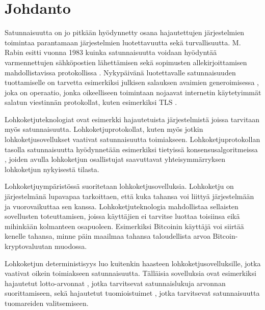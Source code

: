 \chapter{Johdanto\label{intro}}

Satunnaisuutta on jo pitkään hyödynnetty osana hajautettujen järjestelmien toimintaa parantamaan järjestelmien luotettavuutta sekä turvallisuutta. M. Rabin esitti vuonna 1983 kuinka satunnaisuutta voidaan hyödyntää varmennettujen sähköpostien lähettämisen sekä sopimusten allekirjoittamisen mahdollistavissa protokollissa \cite{rabin_transaction_1983}. Nykypäivänä luotettavalle satunnaisuuden tuottamiselle on tarvetta esimerkiksi julkisen salauksen avaimien generoimisessa \cite{corrigan-gibbs_ensuring_2014}, joka on operaatio, jonka oikeelliseen toimintaan nojaavat internetin käytetyimmät salatun viestinnän protokollat, kuten esimerkiksi TLS \cite{rescorla_transport_2018}. 

Lohkoketjuteknologiat ovat esimerkki hajautetuista järjestelmistä joissa tarvitaan myös satunnaisuutta. Lohkoketjuprotokollat, kuten myös jotkin lohkoketjusovellukset vaativat satunnaisuutta toimiakseen. Lohkoketjuprotokollan tasolla satunnaisuutta hyödynnetään esimerkiksi tietyissä konsensusalgoritmeissa \cite{gilad_algorand_2017, hanke_dfinity_2018}, joiden avulla lohkoketjun osallistujat saavuttavat yhteisymmärryksen lohkoketjun nykyisestä tilasta. 


Lohkoketjuympäristössä suoritetaan lohkoketjusovelluksia. Lohkoketju on järjestelmänä lupavapaa tarkoittaen, että kuka tahansa voi liittyä järjestelmään ja vuorovaikuttaa sen kanssa. Lohkoketjuteknologia mahdollistaa sellaisten sovellusten toteuttamisen, joissa käyttäjien ei tarvitse luottaa toisiinsa eikä mihinkään kolmanteen osapuoleen. Esimerkiksi Bitcoinin käyttäjä voi siirtää kenelle tahansa, minne päin maailmaa tahansa taloudellista arvoa Bitcoin-kryptovaluutan muodossa.

Lohkoketjun deterministisyys luo kuitenkin haasteen lohkoketjusovelluksille, jotka vaativat oikein toimiakseen satunnaisuutta. Tälläisia sovelluksia ovat esimerkiksi hajautetut lotto-arvonnat \cite{pooltogether_pooltogether_nodate}, jotka tarvitsevat satunnaislukuja arvonnan suorittamiseen, sekä hajautetut tuomioistuimet \cite{lesaege_kleros_2020}, jotka tarvitsevat satunnaisuutta tuomareiden valitsemiseen. 

